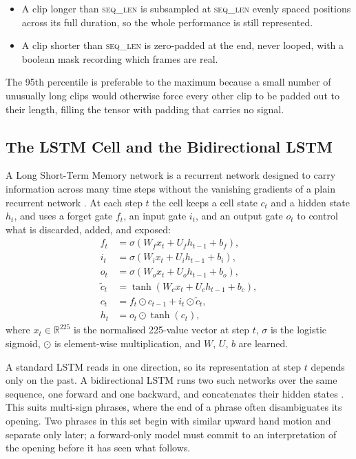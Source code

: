 \begin{itemize}
    \item A clip longer than \textsc{seq\_len} is subsampled at \textsc{seq\_len} evenly spaced positions across its full duration, so the whole performance is still represented.
    \item A clip shorter than \textsc{seq\_len} is zero-padded at the end, never looped, with a boolean mask recording which frames are real.
\end{itemize}

\noindent The 95th percentile is preferable to the maximum because a small number of unusually long clips would otherwise force every other clip to be padded out to their length, filling the tensor with padding that carries no signal.

\subsection{The LSTM Cell and the Bidirectional LSTM}
A Long Short-Term Memory network is a recurrent network designed to carry information across many time steps without the vanishing gradients of a plain recurrent network \cite{hochreiter1997lstm}. At each step $t$ the cell keeps a cell state $c_t$ and a hidden state $h_t$, and uses a forget gate $f_t$, an input gate $i_t$, and an output gate $o_t$ to control what is discarded, added, and exposed:
\begin{align}
    f_t &= \sigma(W_f x_t + U_f h_{t-1} + b_f), \\
    i_t &= \sigma(W_i x_t + U_i h_{t-1} + b_i), \\
    o_t &= \sigma(W_o x_t + U_o h_{t-1} + b_o), \\
    \tilde{c}_t &= \tanh(W_c x_t + U_c h_{t-1} + b_c), \\
    c_t &= f_t \odot c_{t-1} + i_t \odot \tilde{c}_t, \\
    h_t &= o_t \odot \tanh(c_t),
\end{align}
where $x_t \in \mathbb{R}^{225}$ is the normalised 225-value vector at step $t$, $\sigma$ is the logistic sigmoid, $\odot$ is element-wise multiplication, and $W$, $U$, $b$ are learned.

A standard LSTM reads in one direction, so its representation at step $t$ depends only on the past. A bidirectional LSTM runs two such networks over the same sequence, one forward and one backward, and concatenates their hidden states \cite{graves2005bilstm}. This suits multi-sign phrases, where the end of a phrase often disambiguates its opening. Two phrases in this set begin with similar upward hand motion and separate only later; a forward-only model must commit to an interpretation of the opening before it has seen what follows.

